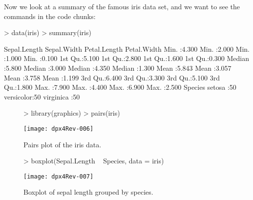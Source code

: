 \documentclass[article]{jss}
\begin{document}
Now we look at a summary of the famous iris data set, and we want to
see the commands in the code chunks:



\begin{Schunk}
\begin{Sinput}
> data(iris)
> summary(iris)
\end{Sinput}
\begin{Soutput}
  Sepal.Length    Sepal.Width     Petal.Length    Petal.Width   
 Min.   :4.300   Min.   :2.000   Min.   :1.000   Min.   :0.100  
 1st Qu.:5.100   1st Qu.:2.800   1st Qu.:1.600   1st Qu.:0.300  
 Median :5.800   Median :3.000   Median :4.350   Median :1.300  
 Mean   :5.843   Mean   :3.057   Mean   :3.758   Mean   :1.199  
 3rd Qu.:6.400   3rd Qu.:3.300   3rd Qu.:5.100   3rd Qu.:1.800  
 Max.   :7.900   Max.   :4.400   Max.   :6.900   Max.   :2.500  
       Species  
 setosa    :50  
 versicolor:50  
 virginica :50  
\end{Soutput}
\end{Schunk}


\begin{figure}[htbp]
  \begin{center}
\begin{Schunk}
\begin{Sinput}
> library(graphics)
> pairs(iris)
\end{Sinput}
\end{Schunk}
\texttt{[image: dpx4Rev-006]}
    \caption{Pairs plot of the iris data.}
  \end{center}
\end{figure}

\begin{figure}[htbp]
  \begin{center}
\begin{Schunk}
\begin{Sinput}
> boxplot(Sepal.Length ~ Species, data = iris)
\end{Sinput}
\end{Schunk}
\texttt{[image: dpx4Rev-007]}
    \caption{Boxplot of sepal length grouped by species.}
  \end{center}
\end{figure}


\end{document}
